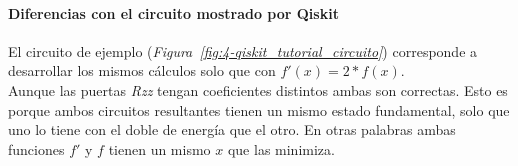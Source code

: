 \paragraph{Diferencias con el circuito mostrado por Qiskit}

El circuito de ejemplo (\textit{Figura~\ref{fig:4-qiskit_tutorial_circuito}}) corresponde a desarrollar los mismos cálculos solo que con $f'(x) = 2*f(x)$. \\
Aunque las puertas \textit{Rzz} tengan coeficientes distintos ambas son correctas. Esto es porque ambos circuitos resultantes tienen un mismo estado fundamental, solo que uno lo tiene con el doble de energía que el otro. En otras palabras ambas funciones $f'$ y $f$ tienen un mismo $x$ que las minimiza.


